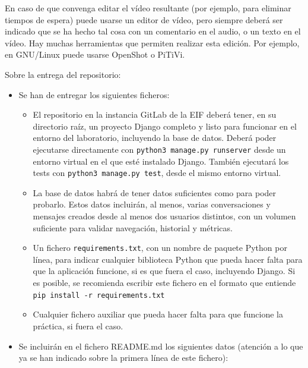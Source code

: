 \begin{enumerate}
En caso de que convenga editar el vídeo resultante (por ejemplo, para eliminar tiempos de espera) puede usarse un editor de vídeo, pero siempre deberá ser indicado que se ha hecho tal cosa con un comentario en el audio, o un texto en el vídeo. Hay muchas herramientas que permiten realizar esta edición. Por ejemplo, en GNU/Linux puede usarse OpenShot o PiTiVi.

\end{enumerate}

Sobre la entrega del repositorio:
\begin{itemize}
  \item Se han de entregar los siguientes ficheros:

\begin{itemize}
\item El repositorio en la instancia GitLab de la EIF deberá tener, en su directorio raíz, un proyecto Django completo y listo para funcionar en el entorno del laboratorio, incluyendo la base de datos. Deberá poder ejecutarse directamente con \verb|python3 manage.py runserver| desde un entorno virtual en el que esté instalado Django. También ejecutará los tests con \verb|python3 manage.py test|, desde el mismo entorno virtual.

\item La base de datos habrá de tener datos suficientes como para poder probarlo. Estos datos incluirán, al menos, varias conversaciones y mensajes creados desde al menos dos usuarios distintos, con un volumen suficiente para validar navegación, historial y métricas.

\item Un fichero \verb|requirements.txt|, con un nombre de paquete Python por línea, para indicar cualquier biblioteca Python que pueda hacer falta para que la aplicación funcione, si es que fuera el caso, incluyendo Django. Si es posible, se recomienda escribir este fichero en el formato que entiende \verb|pip install -r requirements.txt|

\item Cualquier fichero auxiliar que pueda hacer falta para que funcione la práctica, si fuera el caso.
\end{itemize}

\item Se incluirán en el fichero README.md los siguientes datos (atención a lo que ya se han indicado sobre la primera línea de este fichero):


\end{itemize}
